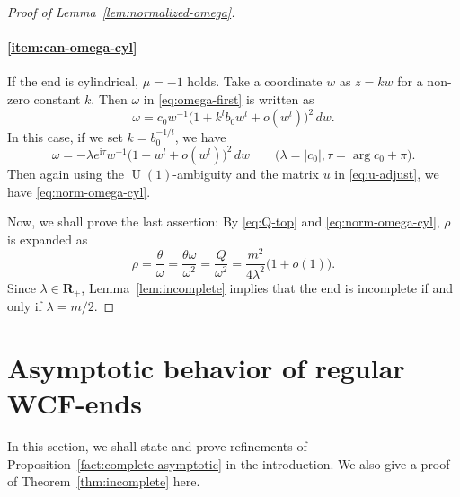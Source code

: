 \documentclass[a4paper]{amsart}
\theoremstyle{plain}
\theoremstyle{remark}
\numberwithin{equation}{section}
\begin{document}
\begin{proof}[Proof of Lemma~\ref{lem:normalized-omega}]
\paragraph{\ref{item:can-omega-cyl}}
 If the end is cylindrical, $\mu=-1$ holds.
 Take a coordinate $w$ as $z=kw$ for a non-zero constant $k$.
 Then $\omega$ in \eqref{eq:omega-first} is written as
 \[
   \omega = c_0 w^{-1}\bigl(1+k^l b_0 w^l+o(w^l)\bigr)^2\,dw.
 \]
 In this case, if we set $k=b_0^{-1/l}$, we have
 \[
   \omega = -\lambda e^{{\mathrm{i}}\tau} w^{-1}
            \bigl(1+w^l+o(w^l)\bigr)^2\,dw
    \qquad\bigl(\lambda=|c_0|,\tau=\arg c_0+\pi).
 \]
 Then again using the ${\operatorname{U}}(1)$-ambiguity and the matrix
 $u$ in \eqref{eq:u-adjust}, we have 
 \eqref{eq:norm-omega-cyl}.

 Now, we shall prove the last assertion:
 By \eqref{eq:Q-top} and \eqref{eq:norm-omega-cyl},
 $\rho$ is expanded as
 \[
    \rho = \frac{\theta}{\omega} =
           \frac{\theta\omega}{\omega^2} 
         = \frac{Q}{\omega^2}
         = \frac{m^2}{4\lambda^2}\bigl(1+o(1)\bigr).
 \]
 Since $\lambda\in{\boldsymbol{R}}_+$, 
 Lemma~\ref{lem:incomplete} implies that the end is incomplete if and
 only if $\lambda=m/2$.
\end{proof}
\section{Asymptotic behavior of regular WCF-ends}
\label{sec:main}
In this section, we shall state and prove refinements of 
Proposition~\ref{fact:complete-asymptotic}
in the introduction.
We also give a proof of Theorem~\ref{thm:incomplete} here.
\end{document}
